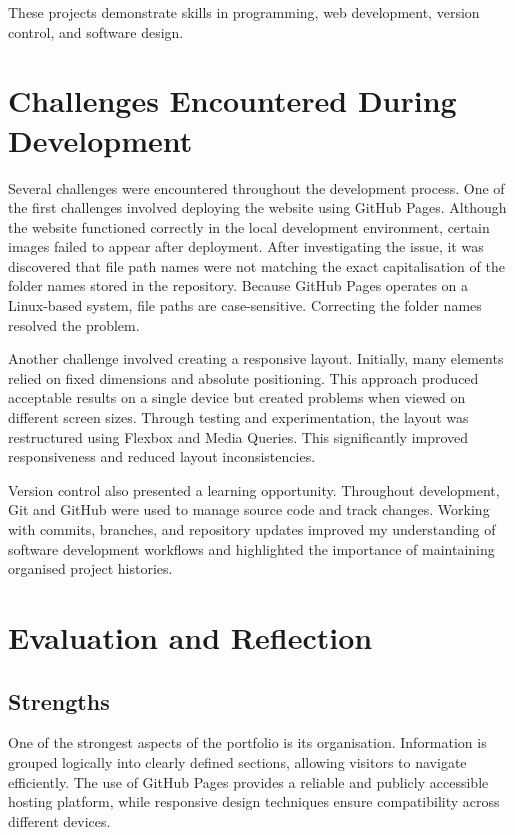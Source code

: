 \documentclass[12pt,a4paper]{article}
\begin{document}
These projects demonstrate skills in programming, web development, version 
control, and software design.


\section{Challenges Encountered During Development}

Several challenges were encountered throughout the development process. One 
of the first challenges involved deploying the website using GitHub Pages. 
Although the website functioned correctly in the local development 
environment, certain images failed to appear after deployment. After 
investigating the issue, it was discovered that file path names were not 
matching the exact capitalisation of the folder names stored in the 
repository. Because GitHub Pages operates on a Linux-based system, file 
paths are case-sensitive. Correcting the folder names resolved the problem.


Another challenge involved creating a responsive layout. Initially, many 
elements relied on fixed dimensions and absolute positioning. This approach 
produced acceptable results on a single device but created problems when 
viewed on different screen sizes. Through testing and experimentation, the 
layout was restructured using Flexbox and Media Queries. This significantly 
improved responsiveness and reduced layout inconsistencies.


Version control also presented a learning opportunity. Throughout 
development, Git and GitHub were used to manage source code and track 
changes. Working with commits, branches, and repository updates improved my 
understanding of software development workflows and highlighted the 
importance of maintaining organised project histories.


\section{Evaluation and Reflection}

\subsection{Strengths}

One of the strongest aspects of the portfolio is its organisation. 
Information is grouped logically into clearly defined sections, allowing 
visitors to navigate efficiently. The use of GitHub Pages provides a 
reliable and publicly accessible hosting platform, while responsive design 
techniques ensure compatibility across different devices.
\end{document}
